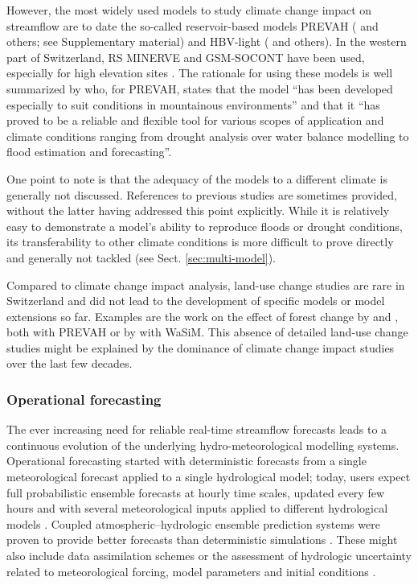 \documentclass[10pt,a4paper]{article}
\begin{document}
However, the most widely used models to study climate change impact on streamflow are to date the so-called reservoir-based models PREVAH (\citealt{Koplin2012, Speich2015, Milano2015a, Brunner2019c} and others;  see Supplementary material) and HBV-light (\citealt{Etter2017, Hakala2020, Brunner2018a, Jenicek2018}  and others). In the western part of Switzerland, RS MINERVE and GSM-SOCONT have been used, especially for high elevation sites \citep{Horton2006, Uhlmann2013a, Uhlmann2013b, Terrier2015}. The rationale for using these models is well summarized by \citet{Koplin2010} who, for PREVAH, states that the model ``has been developed especially to suit conditions in mountainous environments'' and that it ``has proved to be a reliable and flexible tool for various scopes of application and climate conditions ranging from drought analysis over water balance modelling to flood estimation and forecasting''. 

One point to note is that the adequacy of the models to a different climate is generally not discussed. References to previous studies are sometimes provided, without the latter having addressed this point explicitly. While it is relatively easy to demonstrate a model's ability to reproduce floods or drought conditions, its transferability to other climate conditions is more difficult to prove directly and generally not tackled (see Sect. \ref{sec:multi-model}). 

Compared to climate change impact analysis, land-use change studies are rare in Switzerland and did not lead to the development of specific models or model extensions so far. Examples are the work on the effect of forest change by \citet{Koplin2013} and \citet{Schattan2013}, both with PREVAH or by \citet{Alaoui2014} with WaSiM. This absence of detailed land-use change studies might be explained by the dominance of climate change impact studies over the last few decades. 


\subsubsection{Operational forecasting}
\label{sec:context:forecasting}

The ever increasing need for reliable real-time streamflow forecasts leads to a continuous evolution of the underlying hydro-meteorological modelling systems. Operational forecasting started with deterministic forecasts from a single meteorological forecast applied to a single hydrological model; today, users expect full probabilistic ensemble forecasts at hourly time scales, updated every few hours and with several meteorological inputs applied to different hydrological models \citep{Jasper2016}. Coupled atmospheric--hydrologic ensemble prediction systems were proven to provide better forecasts than deterministic simulations \citep{Verbunt2007, Zappa2008, Jaun2008, Liechti2013}. These might also include data assimilation schemes \citep{JorgHess2015a} or the assessment of hydrologic uncertainty related to meteorological forcing, model parameters and initial conditions \citep{Jaun2009, Zappa2011a, Fundel2011}.
\end{document}
